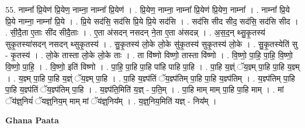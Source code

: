 \documentclass[17pt]{extarticle}
\begin{document}
55. नाम्ना᳚ प्रि॒येण॑ प्रि॒येण॒ नाम्ना॒ नाम्ना᳚ प्रि॒येण॑ । . प्रि॒येण॒ नाम्ना॒ नाम्ना᳚ प्रि॒येण॑ प्रि॒येण॒ नाम्ना᳚ । . नाम्ना᳚ प्रि॒ये प्रि॒ये नाम्ना॒ नाम्ना᳚ प्रि॒ये । . प्रि॒ये सद॑सि॒ सद॑सि प्रि॒ये प्रि॒ये सद॑सि । . सद॑सि सीद सीद॒ सद॑सि॒ सद॑सि सीद । . सी॒दै॒ता ए॒ताः सी॑द सीदै॒ताः । . ए॒ता अ॑सदन् नसदन् ने॒ता ए॒ता अ॑सदन्न् । . अ॒स॒द॒न् थ्सु॒कृ॒तस्य॑ सुकृ॒तस्या॑सदन् नसदन् थ्सुकृ॒तस्य॑ । . सु॒कृ॒तस्य॑ लो॒के लो॒के सु॑कृ॒तस्य॑ सुकृ॒तस्य॑ लो॒के । . सु॒कृ॒तस्येति॑ सु - कृ॒तस्य॑ । . लो॒के तास्ता लो॒के लो॒के ताः । . ता वि॑ष्णो विष्णो॒ तास्ता वि॑ष्णो । . वि॒ष्णो॒ पा॒हि॒ पा॒हि॒ वि॒ष्णो॒ वि॒ष्णो॒ पा॒हि॒ । . वि॒ष्णो॒ इति॑ विष्णो । . पा॒हि॒ पा॒हि पा॒हि पा॑हि पाहि पा॒हि । . पा॒हि य॒ज्ञ्ं ॅय॒ज्ञ्म् पा॒हि पा॒हि य॒ज्ञ्म् । . य॒ज्ञ्म् पा॒हि पा॒हि य॒ज्ञ्ं ॅय॒ज्ञ्म् पा॒हि । . पा॒हि य॒ज्ञ्प॑तिं ॅय॒ज्ञ्प॑तिम् पा॒हि पा॒हि य॒ज्ञ्प॑तिम् । . य॒ज्ञ्प॑तिम् पा॒हि पा॒हि य॒ज्ञ्प॑तिं ॅय॒ज्ञ्प॑तिम् पा॒हि । . य॒ज्ञ्प॑ति॒मिति॑ य॒ज्ञ् - प॒ति॒म् । . पा॒हि माम् माम् पा॒हि पा॒हि माम् । . मां ॅय॑ज्ञ्॒नियं॑ ॅयज्ञ्॒निय॒म् माम् मां ॅय॑ज्ञ्॒निय᳚म् । . य॒ज्ञ्॒निय॒मिति॑ यज्ञ् - निय᳚म् । \newline

\textbf{Ghana Paata } \newline
\end{document}
